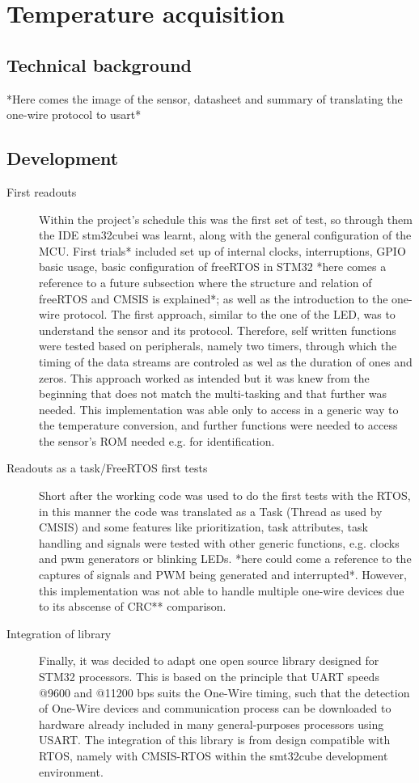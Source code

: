 \section{Temperature acquisition}\label{sec:temperature}

\subsection{Technical background}
*Here comes the image of the sensor, datasheet and summary of translating the one-wire protocol to usart*
\subsection{Development}
\begin{description}
\item[First readouts] Within the project's schedule this was the first set of test, so through them the IDE stm32cubei was learnt, along with the general configuration of the MCU. First trials* included set up of internal clocks, interruptions, GPIO basic usage, basic configuration of freeRTOS in STM32 *here comes a reference to a future subsection where the structure and relation of freeRTOS and CMSIS is explained*; as well as the introduction to the one-wire protocol. The first approach, similar to the one of the LED, was to understand the sensor and its protocol. Therefore, self written functions were tested based on peripherals, namely two timers, through which the timing of the data streams are controled as wel as the duration of ones and zeros. This approach worked as intended but it was knew from the beginning that does not match the multi-tasking and that further was needed. This implementation was able only to access in a generic way to the temperature conversion, and further functions were needed to access the sensor's ROM needed e.g. for identification.
\item[Readouts as a task/FreeRTOS first tests] Short after the working code was used to do the first tests with the RTOS, in this manner the code was translated as a Task (Thread as used by CMSIS) and some features like prioritization, task attributes, task handling and signals were tested with other generic functions, e.g. clocks and pwm generators or blinking LEDs. *here could come a reference to the captures of signals and PWM being generated and interrupted*. However, this implementation was not able to handle multiple one-wire devices due to its abscense of CRC** comparison.
\item[Integration of library] Finally, it was decided to adapt one open source library designed for STM32 processors. This is based on the principle that UART speeds @9600 and @11200 bps suits the One-Wire timing, such that the detection of One-Wire devices and communication process can be downloaded to hardware already included in many general-purposes processors using USART. The integration of this library is from design compatible with RTOS, namely with CMSIS-RTOS within the smt32cube development environment.
\end{description}


